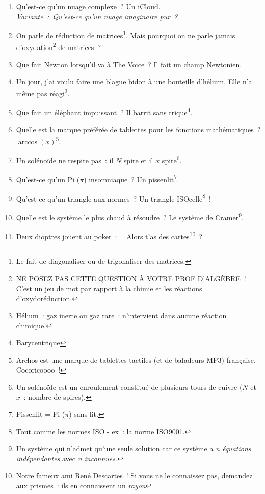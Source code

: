 \documentclass[10pt,a5paper,fullpage]{book}
\begin{document}
\begin{enumerate}
		\item Qu’est-ce qu’un nuage complexe~? Un iCloud. \\\textit{\underline{Variante}~: Qu’est-ce qu’un nuage imaginaire pur~?}
		\item On parle de réduction de matrices\footnote{Le fait de diagonaliser ou de trigonaliser des matrices.}. Mais pourquoi on ne parle jamais d’oxydation\footnote{NE POSEZ PAS CETTE QUESTION À VOTRE PROF D’ALGÈBRE~! C’est un jeu de mot par rapport à la chimie et les réactions d’oxydoréduction.} de matrices~?
		\item Que fait Newton lorsqu’il va à The Voice~? Il fait un champ Newtonien.
		\item Un jour, j’ai voulu faire une blague bidon à une bouteille d’hélium. Elle n’a même pas réagi\footnote{Hélium~: gaz inerte ou gaz rare~: n’intervient dans aucune réaction chimique.}.
		\item Que fait un éléphant impuissant~? Il barrit sans trique\footnote{Barycentrique}.
		\item Quelle est la marque préférée de tablettes pour les fonctions mathématiques~? $\arccos(x)$\footnote{Archos est une marque de tablettes tactiles (et de baladeurs MP3) française. Cocoricoooo~!}.
		\item Un solénoïde ne respire pas~: il $N$ spire et il $x$ spire\footnote{Un solénoïde est un enroulement constitué de plusieurs tours de cuivre ($N$ et $x$~: nombre de spires).}. 
		\item Qu’est-ce qu’un Pi ($\pi$) insomniaque~? Un pissenlit\footnote{Pissenlit = Pi ($\pi$) sans lit.}.
		\item Qu’est-ce qu’un triangle aux normes~? Un triangle ISOcelle\footnote{Tout comme les normes ISO - ex~: la norme ISO9001.}~!
		\item Quelle est le système le plus chaud à résoudre~? Le système de Cramer\footnote{Un système qui n’admet qu’une seule solution car ce système a \textit{n équations indépendantes} avec \textit{n inconnues}.}.
		\item Deux dioptres jouent au poker~: \guillemotleft~ Alors t’as des cartes\footnote{Notre fameux ami René Descartes~! Si vous ne le connaissez pas, demandez aux prismes~: ils en connaissent un \textit{rayon}}~?~\guillemotright

\end{enumerate}
\end{document}
